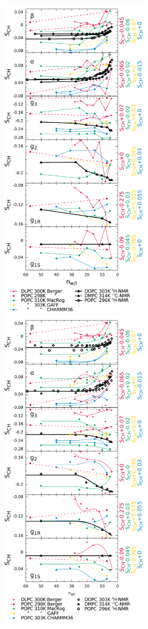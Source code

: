 \documentclass[journal=jacsat,manuscript=article]{achemso}
\begin{document}
\begin{figure}[]
  \centering
  \includegraphics[width=7.3cm]{../DATAreportediINblog/dehydration_lp.pdf}
    \includegraphics[width=7.3cm]{../DATAreportediINblog/dehydration_smooth.pdf}

\end{figure}
\end{document}
